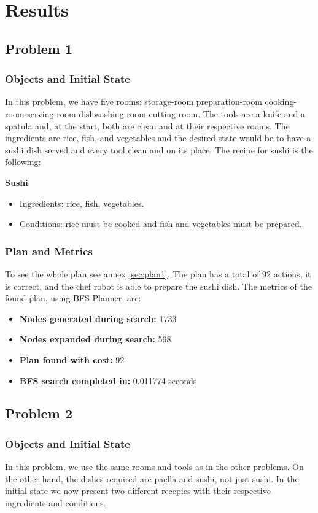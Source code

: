 \documentclass[a4paper,12pt]{article}
\begin{document}
\section{Results}
\subsection{Problem 1}
\subsubsection{Objects and Initial State}
In this problem, we have five rooms: storage-room preparation-room cooking-room serving-room dishwashing-room cutting-room. The tools are a knife and a spatula and, at the start, both are clean and at their respective rooms. The ingredients are rice, fish, and vegetables and the desired state would be to have a sushi dish served and every tool clean and on its place. The recipe for sushi is the following:

\textbf{Sushi}
\begin{itemize}
    \item Ingredients: rice, fish, vegetables.
    \item Conditions: rice must be cooked and fish and vegetables must be prepared.
\end{itemize}
\subsubsection{Plan and Metrics}
To see the whole plan see annex \ref{sec:plan1}. The plan has a total of 92 actions, it is correct, and the chef robot is able to prepare the sushi dish. The metrics of the found plan, using BFS Planner, are:

\begin{itemize}
    \item \textbf{Nodes generated during search:} 1733
    \item \textbf{Nodes expanded during search:} 598
    \item \textbf{Plan found with cost:} 92
    \item \textbf{BFS search completed in:} 0.011774 seconds
\end{itemize}



\subsection{Problem 2}
\subsubsection{Objects and Initial State}
In this problem, we use the same rooms and tools as in the other problems. On the other hand, the dishes required are paella and sushi, not just sushi. In the initial state we now present two different recepies with their respective ingredients and conditions.
\end{document}
